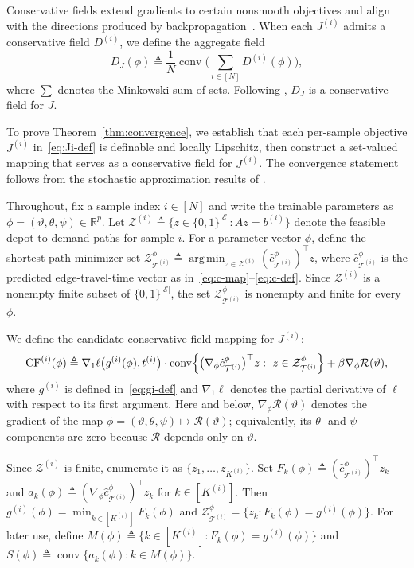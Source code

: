 \documentclass[11pt, letterpaper, oneside, reqno]{amsart}
\DeclareMathOperator*{\argmin}{arg\,min}
\newcommand{\R}{\mathbb{R}}
\newcommand{\Let}{\triangleq}
\begin{document}
Conservative fields extend gradients to certain nonsmooth objectives and align with the directions produced by backpropagation~\cite{ref:bolte2020mathematical}. When each $J^{(i)}$ admits a conservative field $D^{(i)}$, we define the aggregate field
\[
D_J(\phi) \Let \frac{1}{N}\operatorname{conv}\bigl(\sum_{i\in[N]} D^{(i)}(\phi)\bigr),
\]
where $\sum$ denotes the Minkowski sum of sets. Following \cite[Section~6.1]{ref:bolte2021conservative}, $D_J$ is a conservative field for $J$.


To prove Theorem~\ref{thm:convergence}, we establish that each per-sample objective $J^{(i)}$ in~\eqref{eq:Ji-def} is definable and locally Lipschitz, then construct a set-valued mapping that serves as a conservative field for $J^{(i)}$. The convergence statement follows from the stochastic approximation results of \cite{ref:bolte2021conservative}.

Throughout, fix a sample index $i\in[N]$ and write the trainable parameters as $\phi=(\vartheta,\theta,\psi)\in\R^p$. Let $\mathcal Z^{(i)}\Let\{z\in\{0,1\}^{|\mathcal E|}:Az=b^{(i)}\}$ denote the feasible depot-to-demand paths for sample $i$. For a parameter vector $\phi$, define the shortest-path minimizer set $\mathcal Z_{\mathcal T^{(i)}}^\phi \Let \argmin_{z\in \mathcal Z^{(i)}}(\hat c_{\mathcal T^{(i)}}^\phi)^\top z$, where $\hat c_{\mathcal T^{(i)}}^\phi$ is the predicted edge-travel-time vector as in~\eqref{eq:c-map}--\eqref{eq:c-def}. Since $\mathcal Z^{(i)}$ is a nonempty finite subset of $\{0,1\}^{|\mathcal E|}$, the set $\mathcal Z_{\mathcal T^{(i)}}^\phi$ is nonempty and finite for every $\phi$.

We define the candidate conservative-field mapping for $J^{(i)}$:
\begin{equation}\label{eq:CF}
\operatorname{CF}^{(i)}(\phi)
\Let \nabla_1\ell\bigl(g^{(i)}(\phi),t^{(i)}\bigr)\cdot
\operatorname{conv}\Bigl\{
\bigl(\nabla_\phi \hat c_{\mathcal T^{(i)}}^\phi\bigr)^\top z:\ z\in\mathcal Z_{\mathcal T^{(i)}}^\phi
\Bigr\}
+\beta \nabla_\phi \mathcal R(\vartheta),
\end{equation}
where $g^{(i)}$ is defined in~\eqref{eq:gi-def} and $\nabla_1\ell$ denotes the partial derivative of $\ell$ with respect to its first argument.
Here and below, $\nabla_\phi\mathcal R(\vartheta)$ denotes the gradient of the map $\phi=(\vartheta,\theta,\psi)\mapsto\mathcal R(\vartheta)$; equivalently, its $\theta$- and $\psi$-components are zero because $\mathcal R$ depends only on $\vartheta$.

Since $\mathcal Z^{(i)}$ is finite, enumerate it as $\{z_1,\dots,z_{K^{(i)}}\}$. Set $F_k(\phi)\Let(\hat c_{\mathcal T^{(i)}}^\phi)^\top z_k$ and $a_k(\phi)\Let(\nabla_\phi\hat c_{\mathcal T^{(i)}}^\phi)^\top z_k$ for $k\in[K^{(i)}]$. Then $g^{(i)}(\phi)=\min_{k\in[K^{(i)}]}F_k(\phi)$ and $\mathcal Z_{\mathcal T^{(i)}}^\phi=\{z_k:F_k(\phi)=g^{(i)}(\phi)\}$. For later use, define $M(\phi)\Let\{k\in[K^{(i)}]:F_k(\phi)=g^{(i)}(\phi)\}$ and $S(\phi)\Let\operatorname{conv}\{a_k(\phi):k\in M(\phi)\}$.
\end{document}
